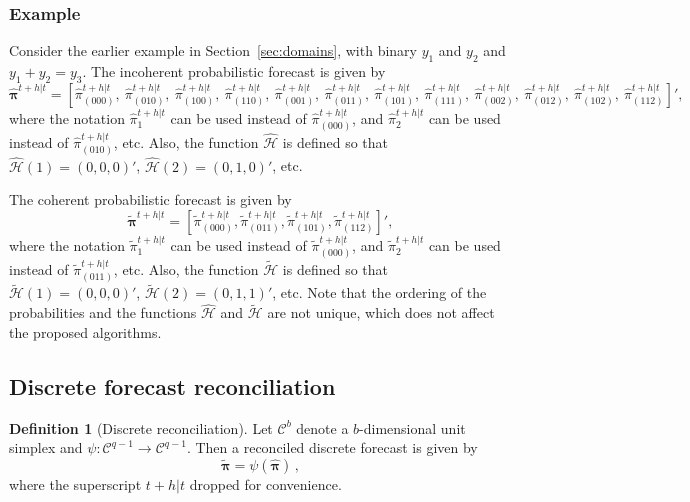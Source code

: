 \documentclass[a4paper,review,12pt,authoryear]{elsarticle}
\newcommand{\bpi}{\bm{\pi}}
\theoremstyle{definition}
\newtheorem{definition}{Definition}[section]
\begin{document}
  \subsubsection*{\textbf{Example}}

  Consider the earlier example in Section~\ref{sec:domains}, with binary $y_1$ and $y_2$ and $y_1+y_2=y_3$. The incoherent probabilistic forecast is given by
  \[
    \hat{\bpi}^{t+h|t}= \left[
      \hat{\pi}^{t+h|t}_{(000)}, ~
       \hat{\pi}^{t+h|t}_{(010)},~
       \hat{\pi}^{t+h|t}_{(100)},~
       \hat{\pi}^{t+h|t}_{(110)},~
       \hat{\pi}^{t+h|t}_{(001)},~
       \hat{\pi}^{t+h|t}_{(011)},~
       \hat{\pi}^{t+h|t}_{(101)},~
       \hat{\pi}^{t+h|t}_{(111)},~
       \hat{\pi}^{t+h|t}_{(002)},~
       \hat{\pi}^{t+h|t}_{(012)},~
       \hat{\pi}^{t+h|t}_{(102)},~
       \hat{\pi}^{t+h|t}_{(112)}
       \right]',
  \]
  where the notation $\hat{\pi}^{t+h|t}_{1}$ can be used instead of $\hat{\pi}^{t+h|t}_{(000)}$, and $\hat{\pi}^{t+h|t}_{2}$ can be used instead of $\hat{\pi}^{t+h|t}_{(010)}$, etc. Also, the function $\hat{\mathcal{H}}$ is defined so that $\hat{\mathcal{H}}(1)=(0,0,0)'$, $\hat{\mathcal{H}}(2)=(0,1,0)'$, etc.

  The coherent probabilistic forecast is given by
  \[
  \tilde{\bpi}^{t+h|t}=\left[
  \tilde{\pi}^{t+h|t}_{(000)},
  \tilde{\pi}^{t+h|t}_{(011)},
  \tilde{\pi}^{t+h|t}_{(101)},
  \tilde{\pi}^{t+h|t}_{(112)}
  \right]',\]
  where the notation $\tilde{\pi}^{t+h|t}_{1}$ can be used instead of $\tilde{\pi}^{t+h|t}_{(000)}$, and $\tilde{\pi}^{t+h|t}_{2}$ can be used instead of $\tilde{\pi}^{t+h|t}_{(011)}$, etc. Also, the function $\tilde{\mathcal{H}}$ is defined so that $\tilde{\mathcal{H}}(1)=(0,0,0)'$, $\tilde{\mathcal{H}}(2)=(0,1,1)'$, etc. Note that the ordering of the probabilities and the functions $\hat{\mathcal{H}}$ and $\tilde{\mathcal{H}}$ are not unique, which does not affect the proposed algorithms.

  \subsection{Discrete forecast reconciliation}\label{sec:discrec}
  
   \begin{definition}[Discrete reconciliation]
  	
  	Let $\mathcal{C}^{b}$ denote a $b$-dimensional unit simplex and $\psi:\mathcal{C}^{q-1} \rightarrow \mathcal{C}^{q-1}$.	Then a reconciled discrete forecast is given by 
  	\[
  	  \tilde{\bpi} = \psi(\hat{\bpi})\,,
  	\]
    where the superscript $t+h|t$ dropped for convenience.
   \end{definition}
    
\end{document}
